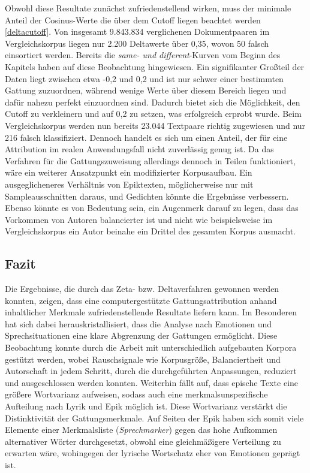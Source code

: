 \documentclass[a4paper,10p]{article}
\begin{document}
Obwohl diese Resultate zunächst zufriedenstellend wirken, muss der minimale Anteil der Cosinus-Werte die über dem Cutoff liegen beachtet werden \ref{deltacutoff}. Von insgesamt 9.843.834 verglichenen Dokumentpaaren im Vergleichskorpus liegen nur 2.200 Deltawerte über 0,35, wovon 50 falsch einsortiert werden. Bereits die \textit{same- und different}-Kurven vom Beginn des Kapitels haben auf diese Beobachtung hingewiesen. Ein signifikanter Großteil der Daten liegt zwischen etwa -0,2 und 0,2 und ist nur schwer einer bestimmten Gattung zuzuordnen, während wenige Werte über diesem Bereich liegen und dafür nahezu perfekt einzuordnen sind. Dadurch bietet sich die Möglichkeit, den Cutoff zu verkleinern und auf 0,2 zu setzen, was erfolgreich erprobt wurde. Beim Vergleichskorpus werden nun bereits 23.044 Textpaare richtig zugewiesen und nur 216 falsch klassifiziert. Dennoch handelt es sich um einen Anteil, der für eine Attribution im realen Anwendungsfall nicht zuverlässig genug ist. Da das Verfahren für die Gattungszuweisung allerdings dennoch in Teilen funktioniert, wäre ein weiterer Ansatzpunkt ein modifizierter Korpusaufbau. Ein ausgeglicheneres Verhältnis von Epiktexten, möglicherweise nur mit Sampleausschnitten daraus, und Gedichten könnte die Ergebnisse verbessern. Ebenso könnte es von Bedeutung sein, ein Augenmerk darauf zu legen, dass das Vorkommen von Autoren balancierter ist und nicht wie beispielsweise im Vergleichskorpus ein Autor beinahe ein Drittel des gesamten Korpus ausmacht.



\subsection{Fazit}
Die Ergebnisse, die durch das Zeta- bzw. Deltaverfahren gewonnen werden konnten, zeigen, dass eine computergestützte Gattungsattribution anhand inhaltlicher Merkmale zufriedenstellende Resultate liefern kann. Im Besonderen hat sich dabei herauskristallisiert, dass die Analyse nach Emotionen und Sprechsituationen eine klare Abgrenzung der Gattungen ermöglicht. Diese Beobachtung konnte durch die Arbeit mit unterschiedlich aufgebauten Korpora gestützt werden, wobei Rauschsignale wie Korpusgröße, Balanciertheit und Autorschaft in jedem Schritt, durch die durchgeführten Anpassungen, reduziert und ausgeschlossen werden konnten. Weiterhin fällt auf, dass epische Texte eine größere Wortvarianz aufweisen, sodass auch eine merkmalsunspezifische Aufteilung nach Lyrik und Epik möglich ist. Diese Wortvarianz verstärkt die Distinktivität der Gattungsmerkmale. Auf Seiten der Epik haben sich somit viele Elemente einer Merkmalsliste (\textit{Sprechmarker}) gegen das hohe Aufkommen alternativer Wörter durchgesetzt, obwohl eine gleichmäßigere Verteilung zu erwarten wäre, wohingegen der lyrische Wortschatz eher von Emotionen geprägt ist. \par 
\end{document}
